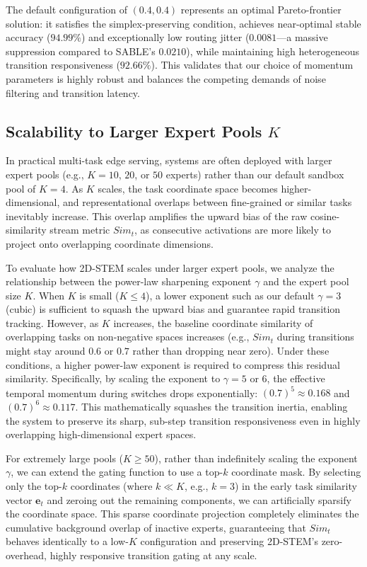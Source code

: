 The default configuration of $(0.4, 0.4)$ represents an optimal Pareto-frontier solution: it satisfies the simplex-preserving condition, achieves near-optimal stable accuracy ($94.99\%$) and exceptionally low routing jitter ($0.0081$---a massive suppression compared to SABLE's $0.0210$), while maintaining high heterogeneous transition responsiveness ($92.66\%$). This validates that our choice of momentum parameters is highly robust and balances the competing demands of noise filtering and transition latency.

\subsection{Scalability to Larger Expert Pools $K$}
In practical multi-task edge serving, systems are often deployed with larger expert pools (e.g., $K = 10$, $20$, or $50$ experts) rather than our default sandbox pool of $K=4$. As $K$ scales, the task coordinate space becomes higher-dimensional, and representational overlaps between fine-grained or similar tasks inevitably increase. This overlap amplifies the upward bias of the raw cosine-similarity stream metric $Sim_t$, as consecutive activations are more likely to project onto overlapping coordinate dimensions. 

To evaluate how 2D-STEM scales under larger expert pools, we analyze the relationship between the power-law sharpening exponent $\gamma$ and the expert pool size $K$. When $K$ is small ($K \le 4$), a lower exponent such as our default $\gamma = 3$ (cubic) is sufficient to squash the upward bias and guarantee rapid transition tracking. However, as $K$ increases, the baseline coordinate similarity of overlapping tasks on non-negative spaces increases (e.g., $Sim_t$ during transitions might stay around $0.6$ or $0.7$ rather than dropping near zero). Under these conditions, a higher power-law exponent is required to compress this residual similarity. Specifically, by scaling the exponent to $\gamma = 5$ or $6$, the effective temporal momentum during switches drops exponentially: $(0.7)^5 \approx 0.168$ and $(0.7)^6 \approx 0.117$. This mathematically squashes the transition inertia, enabling the system to preserve its sharp, sub-step transition responsiveness even in highly overlapping high-dimensional expert spaces. 

For extremely large pools ($K \ge 50$), rather than indefinitely scaling the exponent $\gamma$, we can extend the gating function to use a top-$k$ coordinate mask. By selecting only the top-$k$ coordinates (where $k \ll K$, e.g., $k=3$) in the early task similarity vector $\mathbf{e}_t$ and zeroing out the remaining components, we can artificially sparsify the coordinate space. This sparse coordinate projection completely eliminates the cumulative background overlap of inactive experts, guaranteeing that $Sim_t$ behaves identically to a low-$K$ configuration and preserving 2D-STEM's zero-overhead, highly responsive transition gating at any scale.

